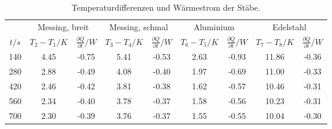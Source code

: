 \begin{table}[!htp]
\centering
\caption{Temperaturdifferenzen und Wärmestrom der Stäbe.}
\label{tab:wstrom}
\begin{tabular}{c c c c c c c c c}
\toprule
 & \multicolumn{2}{c}{Messing, breit} & \multicolumn{2}{c}{Messing, schmal} & \multicolumn{2}{c}{Aluminium} & \multicolumn{2}{c}{Edelstahl} \\
\cmidrule(lr){2-3}\cmidrule(lr){4-5}\cmidrule(lr){6-7}\cmidrule(lr){8-9}
{$t/s$}
 & {$T_2 -T_1 / K$} & {$\frac{\partial Q}{\partial t} / W$} &{$T_3 -T_4 / K$} & {$\frac{\partial Q}{\partial t} / W$}&{$T_6 -T_5 / K$} & {$\frac{\partial Q}{\partial t} / W$}&{$T_7 -T_8 / K$} & {$\frac{\partial Q}{\partial t} / W$} \\
\midrule
140 & 4.45 & -0.75 & 5.41 & -0.53 & 2.63 &-0.93&11.86&-0.36\\
280 & 2.88 & -0.49 & 4.08 & -0.40 & 1.97 &-0.69&11.00&-0.33 \\
420 & 2.46 & -0.42 & 3.81 & -0.38 & 1.62 &-0.57&10.46&-0.31\\
560 & 2.34 & -0.40 & 3.78 & -0.37 & 1.58 &-0.56&10.23&-0.31\\
700 & 2.30 & -0.39 & 3.76 & -0.37 & 1.55 &-0.55&10.04&-0.30\\
\bottomrule
\end{tabular}
\end{table}
